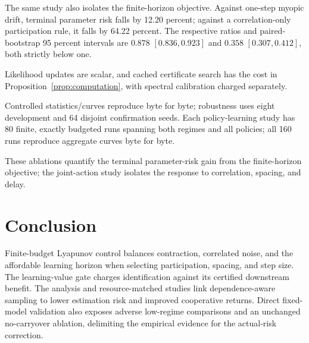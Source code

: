 \documentclass[journal]{IEEEtran}
\begin{document}
The same study also isolates the finite-horizon objective.
Against one-step myopic drift, terminal parameter risk falls by 12.20 percent; against a correlation-only participation rule, it falls by 64.22 percent.
The respective ratios and paired-bootstrap 95 percent intervals are $0.878$ $[0.836,0.923]$ and $0.358$ $[0.307,0.412]$, both strictly below one.

Likelihood updates are scalar, and cached certificate search has the cost in Proposition~\ref{prop:computation}, with spectral calibration charged separately.

Controlled statistics/curves reproduce byte for byte; robustness uses eight development and 64 disjoint confirmation seeds.
Each policy-learning study has 80 finite, exactly budgeted runs spanning both regimes and all policies; all 160 runs reproduce aggregate curves byte for byte.

These ablations quantify the terminal parameter-risk gain from the finite-horizon objective; the joint-action study isolates the response to correlation, spacing, and delay.

\section{Conclusion}
Finite-budget Lyapunov control balances contraction, correlated noise, and the affordable learning horizon when selecting participation, spacing, and step size.
The learning-value gate charges identification against its certified downstream benefit.
The analysis and resource-matched studies link dependence-aware sampling to lower estimation risk and improved cooperative returns.
Direct fixed-model validation also exposes adverse low-regime comparisons and an unchanged no-carryover ablation, delimiting the empirical evidence for the actual-risk correction.

\appendices



\end{document}
